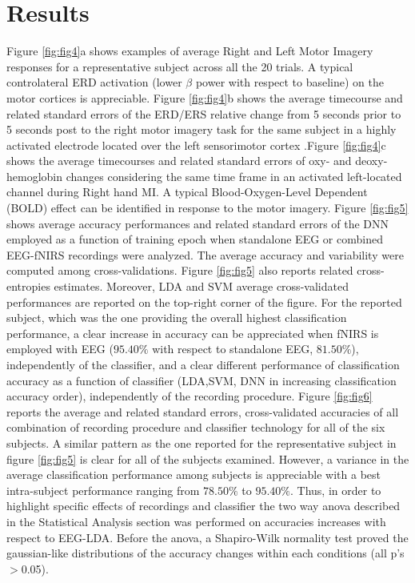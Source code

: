 \documentclass[12pt ]{iopart}
\begin{document}
\section{Results}
Figure \ref{fig:fig4}a shows examples of average Right and Left Motor Imagery responses for a representative subject across all the 20 trials.
A typical controlateral ERD activation (lower $\beta$ power with respect to baseline) on the motor cortices is appreciable.
Figure \ref{fig:fig4}b shows the average timecourse and related standard errors of the ERD/ERS relative change from 5 seconds prior to 5 seconds post to the right motor imagery task for the same subject in a highly activated electrode located over the left sensorimotor cortex .Figure \ref{fig:fig4}c shows the average timecourses and related standard errors of oxy- and deoxy-hemoglobin changes considering the same time frame in an activated left-located channel during Right hand MI. A typical Blood-Oxygen-Level Dependent (BOLD) effect can be identified in response to the motor imagery. 
Figure \ref{fig:fig5} shows average accuracy performances and related standard errors
of the DNN employed as a function of training epoch when standalone EEG or combined EEG-fNIRS recordings were analyzed. The average accuracy and variability were computed among cross-validations. 
Figure \ref{fig:fig5} also reports related cross-entropies estimates.
Moreover, LDA and SVM average cross-validated performances are reported on the top-right corner of the figure.
For the reported subject, which was the one providing the overall highest classification performance, a clear increase in accuracy can be appreciated when fNIRS is employed with EEG ($95.40\%$ with respect to standalone EEG, $81.50\%$), independently of the classifier, and a clear different performance of classification accuracy as a function of classifier (LDA,SVM, DNN in increasing classification accuracy order), independently of the recording procedure.
Figure \ref{fig:fig6} reports the average and related standard errors, cross-validated accuracies of all combination of recording procedure and classifier technology for all of the six subjects. A similar pattern as the one reported for the representative subject in figure \ref{fig:fig5} is clear for all of the subjects examined.
However, a variance in the average classification performance among subjects is appreciable with a best intra-subject performance ranging from $78.50\%$ to $95.40\%$. 
Thus, in order to highlight specific effects of recordings and classifier the two way anova described in the Statistical Analysis section was performed on accuracies increases with respect to EEG-LDA. Before the anova, a Shapiro-Wilk normality test proved the gaussian-like distributions of the accuracy changes within each conditions (all p's$>$0.05).
\end{document}
